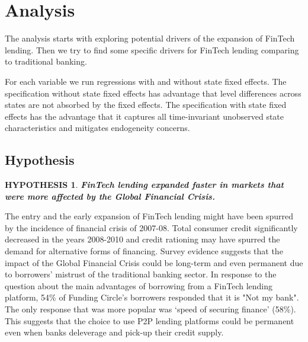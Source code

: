 \documentclass[11pt, a4paper, leqno]{article}
\newtheorem{hypothesis}{HYPOTHESIS}
\begin{document}
\section{Analysis}
The analysis starts with exploring potential drivers of the expansion of FinTech lending. Then we try to find some specific drivers for FinTech lending comparing to traditional banking.

For each variable we run regressions with and without state fixed effects. The specification without state fixed effects has advantage that level differences across states are not absorbed by the fixed effects. The specification with state fixed effects has the advantage that it captures all time-invariant unobserved state characteristics and mitigates endogeneity concerns.

\subsection{Hypothesis}
\begin{hypothesis}
\textbf{FinTech lending expanded faster in markets that were more affected by the Global Financial Crisis.}
\end{hypothesis}

The entry and the early expansion of FinTech lending might have been spurred by the incidence of financial crisis of 2007-08. Total consumer credit significantly decreased in the years 2008-2010 and credit rationing may have spurred the demand for alternative forms of financing. Survey evidence suggests that the impact of the Global Financial Crisis could be long-term and even permanent due to borrowers' mistrust of the traditional banking sector. In response to the question about the main advantages of borrowing from a FinTech lending platform, 54\% of Funding Circle's borrowers responded that it is "Not my bank". The only response that was more popular was ‘speed of securing finance’ (58\%). This suggests that the choice to use P2P lending platforms could be permanent even when banks deleverage and pick-up their credit supply.
\end{document}
